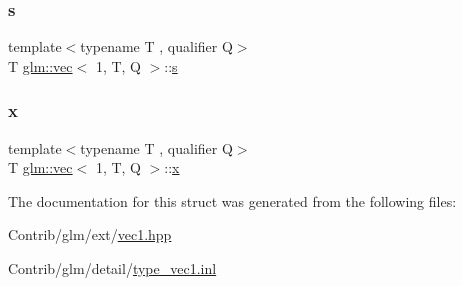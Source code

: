 \mbox{\label{structglm_1_1vec_3_011_00_01_t_00_01_q_01_4_a8369797bacdb23e8720d4967e1cd5af8}} 
\subsubsection{\texorpdfstring{s}{s}}
{\footnotesize\ttfamily template$<$typename T , qualifier Q$>$ \\
T \mbox{\hyperlink{structglm_1_1vec}{glm\+::vec}}$<$ 1, T, Q $>$\+::\mbox{\hyperlink{_s_d_l__opengl_8h_a4af680a6c683f88ed67b76f207f2e6e4}{s}}}

\mbox{\label{structglm_1_1vec_3_011_00_01_t_00_01_q_01_4_a81767d72ae05f8cf2e904cc16ce924a2}} 
\subsubsection{\texorpdfstring{x}{x}}
{\footnotesize\ttfamily template$<$typename T , qualifier Q$>$ \\
T \mbox{\hyperlink{structglm_1_1vec}{glm\+::vec}}$<$ 1, T, Q $>$\+::\mbox{\hyperlink{_s_d_l__opengl_8h_ad0e63d0edcdbd3d79554076bf309fd47}{x}}}



The documentation for this struct was generated from the following files\+:\begin{DoxyCompactItemize}
\item 
Contrib/glm/ext/\mbox{\hyperlink{ext_2vec1_8hpp}{vec1.\+hpp}}\item 
Contrib/glm/detail/\mbox{\hyperlink{type__vec1_8inl}{type\+\_\+vec1.\+inl}}\end{DoxyCompactItemize}
